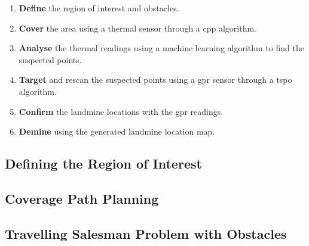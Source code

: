 \begin{enumerate}
    \item \textbf{Define} the region of interest and obstacles.
    \item \textbf{Cover} the area using a thermal sensor through a \gls{cpp} algorithm.
    \item \textbf{Analyse} the thermal readings using a machine learning algorithm to find the suspected points.
    \item \textbf{Target} and rescan the suspected points using a \gls{gpr} sensor through a \gls{tspo} algorithm.
    \item \textbf{Confirm} the landmine locations with the \gls{gpr} readings. 
    \item \textbf{Demine} using the generated landmine location map. 
\end{enumerate}

\subsection{Defining the Region of Interest}

\subsection{Coverage Path Planning}

\subsection{Travelling Salesman Problem with Obstacles}

